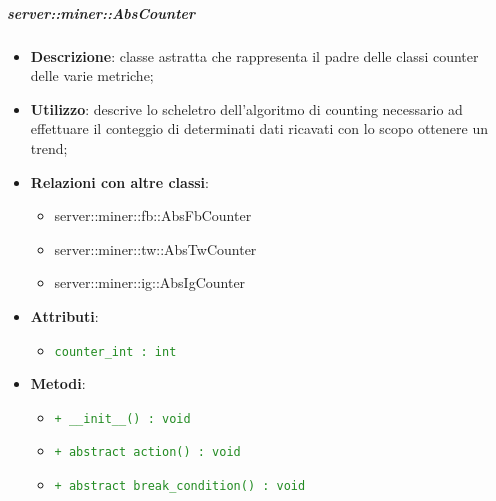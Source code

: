 		\subparagraph{server::miner::AbsCounter} %
		\label{subp:server_miner_AbsCounter}
			\begin{itemize}
				\item \textbf{Descrizione}: classe astratta che rappresenta il padre delle classi counter delle varie metriche;
				\item \textbf{Utilizzo}: descrive lo scheletro dell'algoritmo di counting necessario ad effettuare il conteggio di determinati dati ricavati con lo scopo ottenere un trend;
				\item \textbf{Relazioni con altre classi}:
					\begin{itemize}
						\item server::miner::fb::AbsFbCounter
						\item server::miner::tw::AbsTwCounter
						\item server::miner::ig::AbsIgCounter
					\end{itemize}
				\item \textbf{Attributi}: 
					\begin{itemize}
						\item \textcolor{forestgreen}{\texttt{counter\_int : int}}
					\end{itemize}
				\item \textbf{Metodi}:   
					\begin{itemize}
						\item \textcolor{forestgreen}{\texttt{+ \_\_init\_\_() : void}}
						\item \textcolor{forestgreen}{\texttt{+ abstract action() : void}}
						\item \textcolor{forestgreen}{\texttt{+ abstract break\_condition() : void}}

\end{itemize}
\end{itemize}
